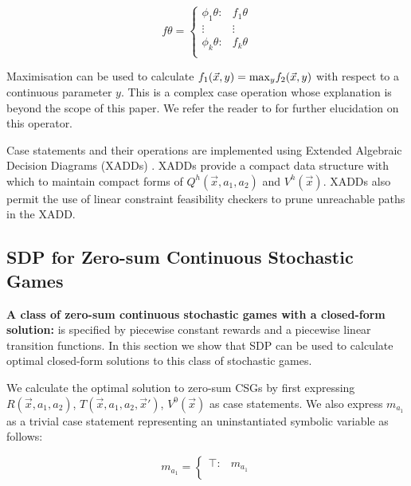 {\small 
\abovedisplayshortskip=0pt
\belowdisplayshortskip=0pt
\begin{equation*}
  f\theta = 
    \begin{cases}
      \phi_1\theta: & f_1\theta \\ 
      \vdots & \vdots\\ 
      \phi_k\theta: & f_k\theta \\ 
    \end{cases} \nonumber
\end{equation*}
}%

Maximisation can be used to calculate $f_1(\vec{x}, y) = \mathrm{max}_{y}f_2(\vec{x}, y) $
with respect to a continuous parameter $y$. This is a complex case operation
whose explanation is beyond the scope of this paper. We refer the reader to 
\cite{Zamani_AAAI_2012} for further elucidation on this operator.

Case statements and their operations are implemented using Extended 
Algebraic Decision Diagrams (XADDs) \cite{Sanner_UAI_2011}.
XADDs provide a compact data structure with which to maintain
compact forms of $Q^{h}(\vec{x}, a_1, a_2)$ and $V^{h}(\vec{x})$. 
XADDs also permit the use of linear constraint feasibility checkers to 
prune unreachable paths in the XADD.

\subsection{SDP for Zero-sum Continuous Stochastic Games}

{\bf A class of zero-sum continuous stochastic games with a closed-form solution:} is specified
by piecewise constant rewards and a piecewise linear transition functions. In this 
section we show that SDP can be used to calculate optimal closed-form
solutions to this class of stochastic games.

We calculate the optimal solution to zero-sum CSGs by first
expressing $R(\vec{x}, a_1, a_2)$, $T(\vec{x}, a_1, a_2, \vec{x}')$, 
$V^0(\vec{x})$ as case statements. We also express $m_{a_{1}}$
as a trivial case statement representing an uninstantiated symbolic variable as follows:

{\small 
\abovedisplayshortskip=-5pt
\belowdisplayshortskip=0pt
\begin{equation*}
  m_{a_{1}} = 
    \begin{cases}
      \top: & m_{a_{1}} \\ 
    \end{cases} \nonumber
\end{equation*}
}%

